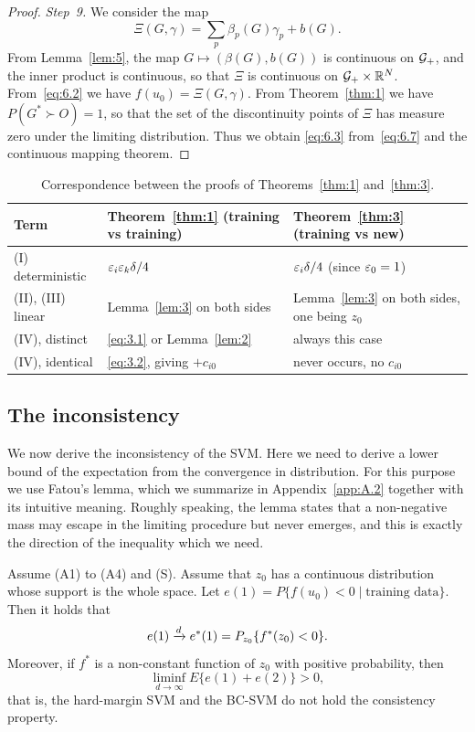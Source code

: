\begin{proof}
\textit{Step~9.} We consider the map
\[
\Xi(G,\gamma)=\sum_p\beta_p(G)\gamma_p+b(G).
\]
From Lemma~\ref{lem:5}, the map $G\mapsto(\beta(G),b(G))$ is continuous on
$\mathcal{G}_+$, and the inner product is continuous, so that $\Xi$ is continuous on
$\mathcal{G}_+\times\mathbb{R}^N$. From~\eqref{eq:6.2} we have $f(u_0)=\Xi(G,\gamma)$. From
Theorem~\ref{thm:1} we have $P(G^*\succ O)=1$, so that the set of the discontinuity
points of $\Xi$ has measure zero under the limiting distribution. Thus we obtain
\eqref{eq:6.3} from~\eqref{eq:6.7} and the continuous mapping theorem.
\end{proof}

\begin{table}[ht]
\centering
\caption{Correspondence between the proofs of Theorems~\ref{thm:1} and~\ref{thm:3}.}
\label{tab:1}
\begin{tabular}{@{}lll@{}}
\toprule
Term & Theorem~\ref{thm:1} (training vs training)
& Theorem~\ref{thm:3} (training vs new) \\
\midrule
(I) deterministic
& $\varepsilon_i\varepsilon_k\delta/4$
& $\varepsilon_i\delta/4$ (since $\varepsilon_0=1$) \\
(II), (III) linear
& Lemma~\ref{lem:3} on both sides
& Lemma~\ref{lem:3} on both sides, one being $z_0$ \\
(IV), distinct
& \eqref{eq:3.1} or Lemma~\ref{lem:2}
& always this case \\
(IV), identical
& \eqref{eq:3.2}, giving $+c_{i0}$
& never occurs, no $c_{i0}$ \\
\bottomrule
\end{tabular}
\end{table}

\subsection{The inconsistency}

We now derive the inconsistency of the SVM. Here we need to derive a lower bound of
the expectation from the convergence in distribution. For this purpose we use
Fatou's lemma, which we summarize in Appendix~\ref{app:A.2} together with its
intuitive meaning. Roughly speaking, the lemma states that a non-negative mass may
escape in the limiting procedure but never emerges, and this is exactly the
direction of the inequality which we need.

\begin{corollary}
\label{cor:1}
Assume \textup{(A1)} to \textup{(A4)} and \textup{(S)}. Assume that $z_0$ has a
continuous distribution whose support is the whole space. Let
$e(1)=P\{f(u_0)<0\mid\text{training data}\}$. Then it holds that
\[
e(1)\xrightarrow{d} e^*(1)=P_{z_0}\{f^*(z_0)<0\}.
\]
Moreover, if $f^*$ is a non-constant function of $z_0$ with positive probability,
then
\[
\liminf_{d\to\infty}E\{e(1)+e(2)\}>0,
\]
that is, the hard-margin SVM and the BC-SVM do not hold the consistency property.
\end{corollary}

